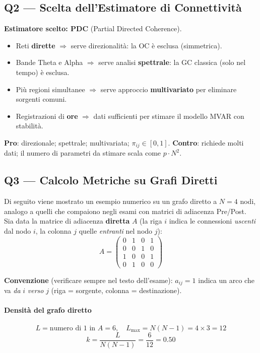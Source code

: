 \documentclass[10pt, letterpaper]{report}
\begin{document}
\subsection*{Q2 — Scelta dell'Estimatore di Connettività}

\textbf{Estimatore scelto: PDC} (Partial Directed Coherence).
\begin{itemize}
    \item Reti \textbf{dirette} $\Rightarrow$ serve direzionalità: la OC è esclusa (simmetrica).
    \item Bande Theta e Alpha $\Rightarrow$ serve analisi \textbf{spettrale}: la GC classica (solo nel tempo) è esclusa.
    \item Più regioni simultanee $\Rightarrow$ serve approccio \textbf{multivariato} per eliminare sorgenti comuni.
    \item Registrazioni di \textbf{ore} $\Rightarrow$ dati sufficienti per stimare il modello MVAR con stabilità.
\end{itemize}
\textbf{Pro}: direzionale; spettrale; multivariata; $\pi_{ij} \in [0,1]$.
\textbf{Contro}: richiede molti dati; il numero di parametri da stimare scala come $p \cdot N^2$.

\subsection*{Q3 — Calcolo Metriche su Grafi Diretti}

Di seguito viene mostrato un esempio numerico su un grafo diretto a $N = 4$ nodi, analogo a quelli che compaiono negli esami con matrici di adiacenza Pre/Post.
Sia data la matrice di adiacenza \textbf{diretta} $A$ (la riga $i$ indica le connessioni \emph{uscenti} dal nodo $i$, la colonna $j$ quelle \emph{entranti} nel nodo $j$):
\[
A = \begin{pmatrix}
0 & 1 & 0 & 1 \\
0 & 0 & 1 & 0 \\
1 & 0 & 0 & 1 \\
0 & 1 & 0 & 0
\end{pmatrix}
\]

\textbf{Convenzione} (verificare sempre nel testo dell'esame):
$a_{ij} = 1$ indica un arco che va \emph{da} $i$ \emph{verso} $j$ (riga = sorgente, colonna = destinazione).

\paragraph{Densità del grafo diretto}
\[
L = \text{numero di 1 in } A = 6, \quad
L_{\text{max}} = N(N-1) = 4 \times 3 = 12
\]
\[
k = \frac{L}{N(N-1)} = \frac{6}{12} = 0.50
\]
\end{document}
